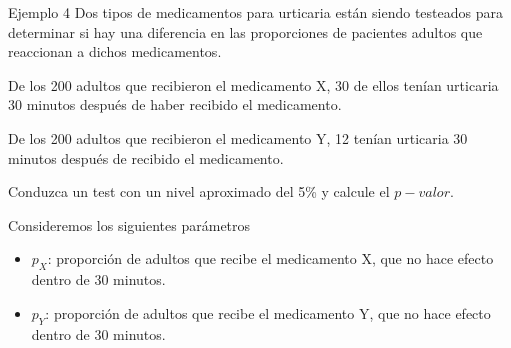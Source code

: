 \documentclass{beamer}
\theoremstyle{definition}
\begin{document}
\begin{frame}{\color{rosee} Ejemplo 4}
\small
Dos tipos de medicamentos para urticaria están siendo testeados para determinar si hay una diferencia en las proporciones de pacientes adultos que reaccionan a 
dichos medicamentos. 

\medskip

De los 200 adultos que recibieron el medicamento X, 30 de ellos tenían urticaria 30 minutos después de haber recibido el medicamento. 

\medskip

De los 200 adultos que recibieron el medicamento Y, 12 tenían urticaria 30 minutos después de recibido el medicamento.

\medskip
Conduzca un test con un nivel aproximado del 5\% y  calcule el $p-valor$.

\medskip

Consideremos los siguientes par\'ametros
\begin{itemize}
    \item $p_X$: proporción de adultos que recibe el medicamento X, que no hace efecto dentro de 30 minutos.
    \item $p_Y$: proporción de adultos que recibe el medicamento Y, que no hace efecto dentro de 30 minutos.
\end{itemize}

\end{frame}
\end{document}
